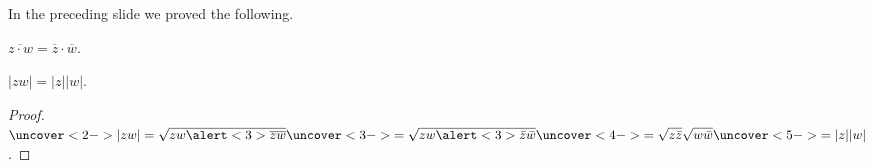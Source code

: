 \begin{frame}
In the preceding slide we proved the following.
\begin{theorem}
$\overline {z\cdot w}=\overline z\cdot \overline w$.
\end{theorem}
\begin{corollary}
\alert<3>{$|zw|=|z||w|$}.
\end{corollary}
\begin{proof}
$\uncover<2->{|zw|= \sqrt{zw \alert<3>{\overline{zw}}}} \uncover<3->{= \sqrt{zw \alert<3>{\bar z \bar w}} } \uncover<4->{ = \sqrt{z\bar z}\sqrt{w\bar w}} \uncover<5->{ = |z| |w|} $.
\end{proof}
\end{frame}